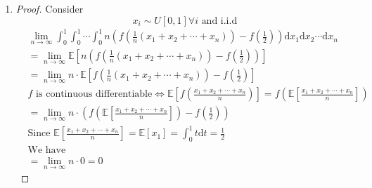 \documentclass{article}
\begin{document}
\begin{enumerate}
        

        \item \begin{proof}
            Consider $$x_i \sim U[0,1] \forall i \text{ and i.i.d}$$
            \begin{align*}
                &\lim_{n\to\infty}{\int_{0}^{1}{ \int_{0}^{1}{ \cdots \int_{0}^{1}}}} n\left(f\left(\frac{1}{n}(x_1+x_2+\cdots+x_n)\right)-f\left(\frac{1}{2}\right)\right)\text{d}x_1\text{d}x_2\cdots\text{d}x_n\\
                &=\lim_{n\to\infty}\mathbb{E}\left[n\left(f\left(\frac{1}{n}(x_1+x_2+\cdots+x_n)\right)-f\left(\frac{1}{2}\right)\right)\right]\\
                &=\lim_{n\to\infty} n\cdot\mathbb{E}\left[f\left(\frac{1}{n}(x_1+x_2+\cdots+x_n)\right)-f\left(\frac{1}{2}\right)\right]\\
                &f \text{ is continuous differentiable} \Leftrightarrow \mathbb{E}\left[f\left(\frac{x_1+x_2+\cdots+x_n}{n}\right)\right]=f\left(\mathbb{E}\left[\frac{x_1+x_2+\cdots+x_n}{n}\right]\right)\\
                &=\lim_{n\to\infty} n\cdot \left(f\left(\mathbb{E}\left[\frac{x_1+x_2+\cdots+x_n}{n}\right]\right)-f\left(\frac{1}{2}\right)\right)\\
                &\text{Since } \mathbb{E}\left[\frac{x_1+x_2+\cdots+x_n}{n}\right]=\mathbb{E}\left[x_1\right]=\int_{0}^1 t\text{d}t=\frac{1}{2}\\
                &\text{We have}\\
                &=\lim_{n\to\infty} n \cdot 0=0
            \end{align*}
        \end{proof}



\end{enumerate}
\end{document}
